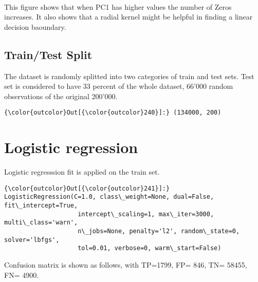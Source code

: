 \documentclass[11pt]{article}
\begin{document}
    \begin{center}
    \end{center}
    { \hspace*{\fill} \\}
    
    This figure shows that when PC1 has higher values the number of Zeros
increases. It also shows that a radial kernel might be helpful in
finding a linear decision baoundary.

    \hypertarget{traintest-split}{%
\subsection{Train/Test Split}\label{traintest-split}}

    The dataset is randomly splitted into two categories of train and test
sets. Test set is considered to have 33 percent of the whole dataset,
66'000 random observations of the original 200'000.

\begin{Verbatim}[commandchars=\\\{\}]
{\color{outcolor}Out[{\color{outcolor}240}]:} (134000, 200)
\end{Verbatim}
            
    \hypertarget{logistic-regression}{%
\section{Logistic regression}\label{logistic-regression}}

    Logistic regresssion fit is applied on the train set.

\begin{Verbatim}[commandchars=\\\{\}]
{\color{outcolor}Out[{\color{outcolor}241}]:} LogisticRegression(C=1.0, class\_weight=None, dual=False, fit\_intercept=True,
                    intercept\_scaling=1, max\_iter=3000, multi\_class='warn',
                    n\_jobs=None, penalty='l2', random\_state=0, solver='lbfgs',
                    tol=0.01, verbose=0, warm\_start=False)
\end{Verbatim}
            
    Confusion matrix is shown as follows, with TP=1799, FP= 846, TN= 58455,
FN= 4900.

    \begin{center}
    \end{center}
    { \hspace*{\fill} \\}
    
\end{document}
